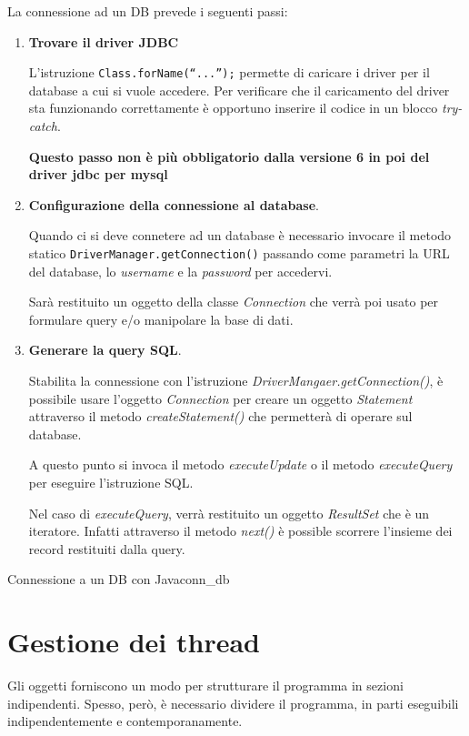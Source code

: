 \documentclass[12pt]{report}
\newcommand{\nmu}{}
\begin{document}
La connessione ad un DB prevede i seguenti passi:
\begin{enumerate}
	\item \textbf{Trovare il driver JDBC}

	L'istruzione \texttt{Class.forName(``...'');} permette di caricare i driver per il database a cui si vuole accedere. Per verificare che il caricamento del driver sta funzionando correttamente è opportuno inserire il codice in un blocco \textit{try-catch}.

	\textbf{Questo passo non è più obbligatorio dalla versione 6 in poi del driver jdbc per mysql}
	\item \textbf{Configurazione della connessione al database}.

	Quando ci si deve connetere ad un database è necessario invocare il metodo statico \texttt{DriverManager.getConnection()} passando come parametri la URL del database, lo \textit{username} e la \textit{password} per accedervi.

	Sarà restituito un oggetto della classe \textit{Connection} che verrà poi usato per formulare query e/o manipolare la base di dati.

	\item \textbf{Generare la query SQL}.

	Stabilita la connessione con l'istruzione \textit{DriverMangaer.getConnection()}, è possibile usare l'oggetto \textit{Connection} per creare un oggetto \textit{Statement} attraverso il metodo \textit{createStatement()} che permetterà di operare sul database.

	A questo punto si invoca il metodo \textit{executeUpdate} o il metodo \textit{executeQuery} per eseguire l'istruzione SQL.

	Nel caso di \textit{executeQuery}, verrà restituito un oggetto \textit{ResultSet} che è un iteratore. Infatti attraverso il metodo \textit{next()} è possible scorrere l'insieme dei record restituiti dalla query.
\end{enumerate}
\begin{example}{\nmu Connessione a un DB con Java}{conn_db}

\end{example}
\section{Gestione dei thread}
Gli oggetti forniscono un modo per strutturare il programma in sezioni indipendenti. Spesso, però, è necessario dividere il programma, in parti eseguibili indipendentemente e contemporanamente.
\end{document}
